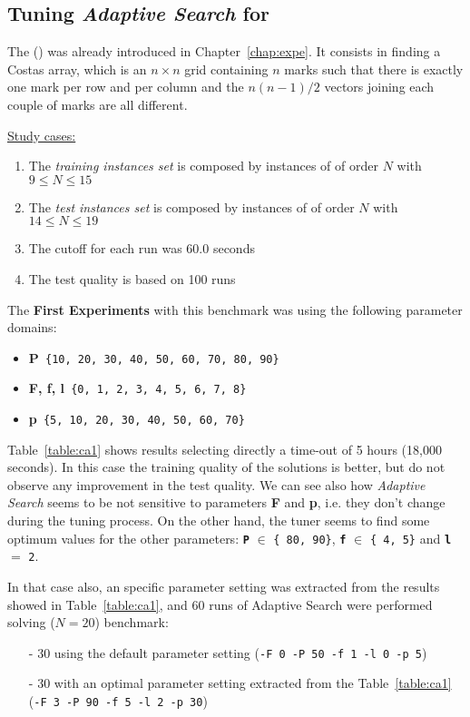 
\subsection{ Tuning {\it Adaptive Search} for \carrp}

The \carrp{} (\CARRP) was already introduced in Chapter~\ref{chap:expe}. It consists in finding a Costas array, which is an $n\times n$ grid containing $n$ marks such that there is exactly one mark per row and per column and the $n(n-1)/2$ vectors joining each couple of marks are all different.

\underline{Study cases:}
\begin{enumerate}
	\item The {\it training instances set} is composed by instances of \CARRP{} of order $N$ with $9 \leq N \leq 15$
	\item The {\it test instances set} is composed by instances of \CARRP{} of order $N$ with $14 \leq N \leq 19$
	\item The cutoff for each run was 60.0 seconds
	\item The test quality is based on 100 runs
\end{enumerate}

The {\bf First Experiments} with this benchmark was using the following parameter domains:
\begin{itemize}[itemsep=0.2mm]
	\item {\bf P}\texttt{ \{10, 20, 30, 40, 50, 60, 70, 80, 90\}}
	\item {\bf F, f, l}\texttt{ \{0, 1, 2, 3, 4, 5, 6, 7, 8\}}
	\item {\bf p}\texttt{ \{5, 10, 20, 30, 40, 50, 60, 70\}}
\end{itemize}

Table~\ref{table:ca1} shows results selecting directly a time-out of 5 hours (18,000 seconds). In this case the training quality of the solutions is better, but do not observe any improvement in the test quality. We can see also how {\it Adaptive Search} seems to be not sensitive to parameters {\bf F} and {\bf p}, i.e. they don't change during the tuning process. On the other hand, the tuner seems to find some optimum values for the other parameters: \texttt{\bf P} $\in$ \texttt{\{ 80, 90\}}, \texttt{\bf f} $\in$ \texttt{\{ 4, 5\}} and \texttt{\bf l} $=$ \texttt{2}.

In that case also, an specific parameter setting was extracted from the results showed in Table~\ref{table:ca1}, and 60 runs of Adaptive Search were performed solving \CARRP{} ($N = 20$) benchmark: 
\begin{itemize}
	\item[-] 30 using the default parameter setting (\texttt{-F 0 -P 50 -f 1 -l 0 -p 5})
	\item[-] 30 with an optimal parameter setting extracted from the Table~\ref{table:ca1} (\texttt{-F 3 -P 90 -f 5 -l 2 -p 30}) 
\end{itemize}

